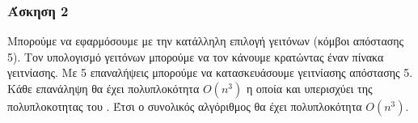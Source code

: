 \subsubsection*{Άσκηση 2}

Μπορούμε να εφαρμόσουμε  με την κατάλληλη επιλογή γειτόνων (κόμβοι απόστασης 5). Τον υπολογισμό γειτόνων μπορούμε να τον
κάνουμε κρατώντας έναν πίνακα γειτνίασης. Με 5 επαναλήψεις μπορούμε να κατασκευάσουμε γειτνίασης απόστασης 5. Κάθε επανάληψη θα έχει πολυπλοκότητα
$O(n^3)$ η οποία και υπερισχύει της πολυπλοκοτητας του . Έτσι ο συνολικός αλγόριθμος θα έχει πολυπλοκότητα $O(n^3)$.
